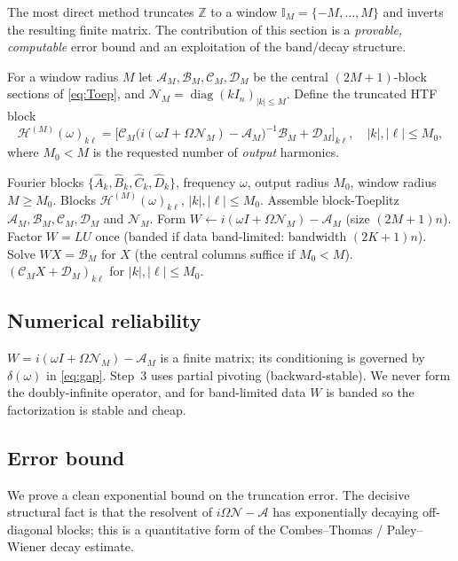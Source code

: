 \documentclass{amsart}
\theoremstyle{definition}
\DeclareMathOperator{\diag}{diag}
\newcommand{\Z}{\mathbb{Z}}
\newcommand{\Acal}{\mathcal{A}}
\newcommand{\Bcal}{\mathcal{B}}
\newcommand{\Ccal}{\mathcal{C}}
\newcommand{\Dcal}{\mathcal{D}}
\newcommand{\Hcal}{\mathcal{H}}
\newcommand{\Ncal}{\mathcal{N}}
\begin{document}
The most direct method truncates $\Z$ to a window
$\mathbb{I}_M=\{-M,\dots,M\}$ and inverts the resulting finite matrix. The
contribution of this section is a \emph{provable, computable} error bound and an
exploitation of the band/decay structure.

For a window radius $M$ let $\Acal_M,\Bcal_M,\Ccal_M,\Dcal_M$ be the central
$(2M{+}1)$-block sections of \eqref{eq:Toep}, and
$\Ncal_M=\diag(kI_n)_{|k|\le M}$. Define the truncated HTF block
\begin{equation}\label{eq:HTFtrunc}
\Hcal^{(M)}(\omega)_{k\ell}
=\big[\Ccal_M\big(i(\omega I+\Omega\Ncal_M)-\Acal_M\big)^{-1}\Bcal_M+\Dcal_M\big]_{k\ell},
\quad |k|,|\ell|\le M_0,
\end{equation}
where $M_0<M$ is the requested number of \emph{output} harmonics.

\begin{algorithm}[H]
\caption{Truncated harmonic-balance HTF at one frequency}\label{alg:trunc}
\begin{algorithmic}[1]
\Require Fourier blocks $\{\hat A_k,\hat B_k,\hat C_k,\hat D_k\}$, frequency $\omega$,
output radius $M_0$, window radius $M\ge M_0$.
\Ensure Blocks $\Hcal^{(M)}(\omega)_{k\ell}$, $|k|,|\ell|\le M_0$.
\State Assemble block-Toeplitz $\Acal_M,\Bcal_M,\Ccal_M,\Dcal_M$ and $\Ncal_M$.
\State Form $W\gets i(\omega I+\Omega\Ncal_M)-\Acal_M$ (size $(2M{+}1)n$).
\State Factor $W=LU$ once (banded if data band-limited: bandwidth $(2K{+}1)n$).
\State Solve $WX=\Bcal_M$ for $X$ (the central columns suffice if $M_0<M$).
\State \Return $(\Ccal_M X+\Dcal_M)_{k\ell}$ for $|k|,|\ell|\le M_0$.
\end{algorithmic}
\end{algorithm}

\subsection{Numerical reliability}
$W=i(\omega I+\Omega\Ncal_M)-\Acal_M$ is a finite matrix; its conditioning is
governed by $\delta(\omega)$ in \eqref{eq:gap}. Step~3 uses partial pivoting
(backward-stable). We never form the doubly-infinite operator, and for
band-limited data $W$ is banded so the factorization is stable and cheap.

\subsection{Error bound}
We prove a clean exponential bound on the truncation error. The decisive
structural fact is that the resolvent of $i\Omega\Ncal-\Acal$ has
exponentially decaying off-diagonal blocks; this is a quantitative form of the
Combes--Thomas / Paley--Wiener decay estimate.
\end{document}
